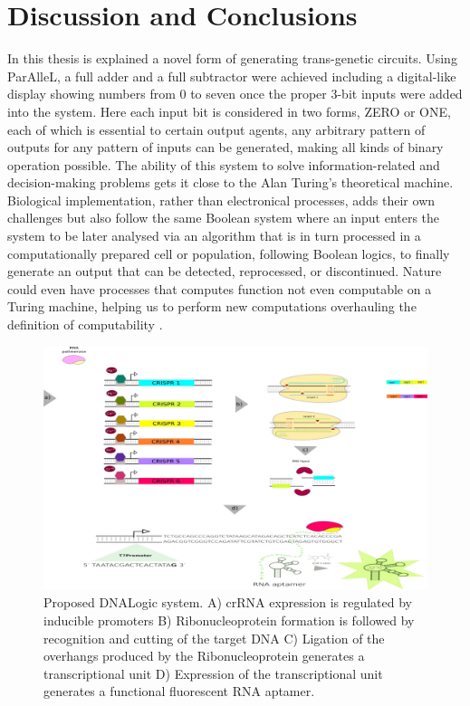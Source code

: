 \chapter{Discussion and Conclusions}

In this thesis is explained a novel form of generating trans-genetic circuits.  Using ParAlleL, a full adder and a full subtractor were achieved including a digital-like display showing numbers from 0 to seven once the proper 3-bit inputs were added into the system. Here each input bit is considered in two forms, ZERO or ONE, each of which is essential to certain output agents, any arbitrary pattern of outputs for any pattern of inputs can be generated, making all kinds of binary operation possible. The ability of this system to solve information-related and decision-making problems gets it close to the Alan Turing’s theoretical machine.  Biological implementation, rather than electronical processes, adds their own challenges but also follow the same Boolean system where an input enters the system to be later analysed via an algorithm that is in turn processed in a computationally prepared cell or population, following Boolean logics, to finally generate an output that can be detected, reprocessed, or discontinued. Nature could even have processes that computes function not even computable on a Turing machine, helping us to perform new computations overhauling the definition of computability \citep{grozinger2019pathways}. 

\begin{figure}[!ht]
  \centering
  \includegraphics[width=1\textwidth]{discussion/chapter/figs/dnalogic.png}
  \caption{Proposed DNALogic system. A) crRNA expression is regulated by inducible promoters B) Ribonucleoprotein formation is followed by recognition and cutting of the target DNA C) Ligation of the overhangs produced by the Ribonucleoprotein generates a transcriptional unit D) Expression of the transcriptional unit generates a functional fluorescent RNA aptamer.}
  \label{fig.discu1}
\end{figure}

